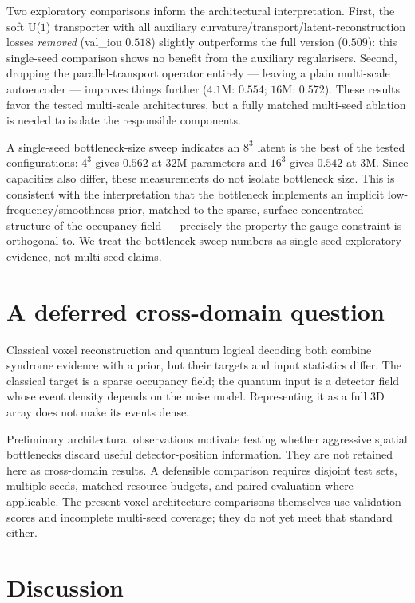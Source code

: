 \documentclass[11pt,a4paper]{article}
\begin{document}
Two exploratory comparisons inform the architectural interpretation. First, the soft U($1$)
transporter with all auxiliary curvature/transport/latent-reconstruction
losses \emph{removed} (val\_iou $0.518$) slightly outperforms the full
version ($0.509$): this single-seed comparison shows no benefit from the
auxiliary regularisers. Second,
dropping the parallel-transport operator entirely --- leaving a plain
multi-scale autoencoder --- improves things further ($4.1$M: $0.554$;
$16$M: $0.572$). These results favor the tested multi-scale architectures, but a
fully matched multi-seed ablation is needed to isolate the responsible
components.

A single-seed bottleneck-size sweep indicates an $8^3$ latent is
the best of the tested configurations: $4^3$ gives $0.562$ at
$32$M parameters and $16^3$ gives $0.542$ at $3$M. Since capacities also
differ, these measurements do not isolate bottleneck size. This is
consistent with the interpretation that the bottleneck implements an
implicit low-frequency/smoothness prior, matched to the sparse,
surface-concentrated structure of the occupancy field --- precisely the
property the gauge constraint is orthogonal to. We treat the
bottleneck-sweep numbers as single-seed exploratory evidence, not
multi-seed claims.

\section{A deferred cross-domain question}
\label{sec:qec}
Classical voxel reconstruction and quantum logical decoding both combine
syndrome evidence with a prior, but their targets and input statistics
differ. The classical target is a sparse occupancy field; the quantum
input is a detector field whose event density depends on the noise model.
Representing it as a full 3D array does not make its events dense.

Preliminary architectural observations motivate testing whether aggressive
spatial bottlenecks discard useful detector-position information.
They are not retained here as cross-domain results. A defensible
comparison requires disjoint test sets, multiple seeds, matched resource
budgets, and paired evaluation where applicable. The present voxel
architecture comparisons themselves use validation scores and incomplete
multi-seed coverage; they do not yet meet that standard either.

\section{Discussion}
\end{document}
